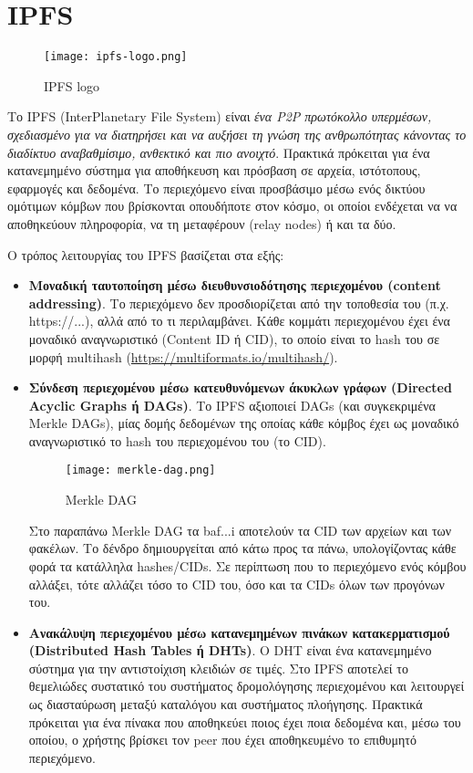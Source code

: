\section{IPFS}

\begin{figure}[H]
	\centering
	\texttt{[image: ipfs-logo.png]}
	\caption{IPFS logo}
\end{figure}

Το IPFS (InterPlanetary File System) είναι \textit{ένα P2P πρωτόκολλο υπερμέσων, σχεδιασμένο για να διατηρήσει και να αυξήσει τη γνώση της ανθρωπότητας κάνοντας το διαδίκτυο αναβαθμίσιμο, ανθεκτικό και πιο ανοιχτό}.\cite{2.7-ipfs}
Πρακτικά πρόκειται για ένα κατανεμημένο σύστημα για αποθήκευση και πρόσβαση σε αρχεία, ιστότοπους, εφαρμογές και δεδομένα. Το περιεχόμενο είναι προσβάσιμο μέσω ενός δικτύου ομότιμων κόμβων που βρίσκονται οπουδήποτε στον κόσμο, οι οποίοι ενδέχεται να να αποθηκεύουν πληροφορία, να τη μεταφέρουν (relay nodes) ή και τα δύο.\cite{2.7-ipfs-docs}

Ο τρόπος λειτουργίας του IPFS βασίζεται στα εξής:

\begin{itemize}
	\item \textbf{Μοναδική ταυτοποίηση μέσω διευθυνσιοδότησης περιεχομένου (content addressing)}. Το περιεχόμενο δεν προσδιορίζεται από την τοποθεσία του (π.χ. https://...), αλλά από το τι περιλαμβάνει. Κάθε κομμάτι περιεχομένου έχει ένα μοναδικό αναγνωριστικό (Content ID ή CID), το οποίο είναι το hash του σε μορφή multihash (\url{https://multiformats.io/multihash/}).
	\item \textbf{Σύνδεση περιεχομένου μέσω κατευθυνόμενων άκυκλων γράφων (Directed Acyclic Graphs ή DAGs)}. Το IPFS αξιοποιεί DAGs (και συγκεκριμένα Merkle DAGs), μίας δομής δεδομένων της οποίας κάθε κόμβος έχει ως μοναδικό αναγνωριστικό το hash του περιεχομένου του (το CID).
	\begin{figure}[H]
		\centering
		\texttt{[image: merkle-dag.png]}
		\caption{Merkle DAG\cite{2.7-merkle-dags-proto-school}}
	\end{figure}
	Στο παραπάνω Merkle DAG τα baf...i αποτελούν τα CID των αρχείων και των φακέλων. Το δένδρο δημιουργείται από κάτω προς τα πάνω, υπολογίζοντας κάθε φορά τα κατάλληλα hashes/CIDs. Σε περίπτωση που το περιεχόμενο ενός κόμβου αλλάξει, τότε αλλάζει τόσο το CID του, όσο και τα CIDs όλων των προγόνων του.
	\item \textbf{Ανακάλυψη περιεχομένου μέσω κατανεμημένων πινάκων κατακερματισμού (Distributed Hash Tables ή DHTs)}. Ο DHT είναι ένα κατανεμημένο σύστημα για την αντιστοίχιση κλειδιών σε τιμές. Στο IPFS αποτελεί το θεμελιώδες συστατικό του συστήματος δρομολόγησης περιεχομένου και λειτουργεί ως διασταύρωση μεταξύ καταλόγου και συστήματος πλοήγησης. Πρακτικά πρόκειται για ένα πίνακα που αποθηκεύει ποιος έχει ποια δεδομένα και, μέσω του οποίου, ο χρήστης βρίσκει τον peer που έχει αποθηκευμένο το επιθυμητό περιεχόμενο.
\end{itemize}

